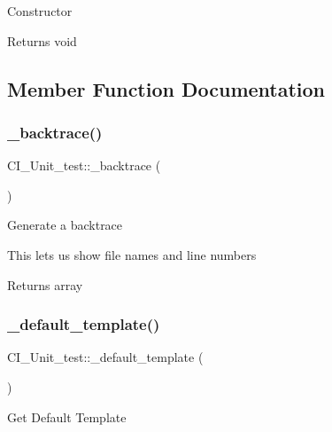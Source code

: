 Constructor

\begin{DoxyReturn}{Returns}
void 
\end{DoxyReturn}


\subsection{Member Function Documentation}
\mbox{\label{class_c_i___unit__test_aac2171b9c9a8e3365412af12f62d7cf8}} 
\subsubsection{\texorpdfstring{\+\_\+backtrace()}{\_backtrace()}}
{\footnotesize\ttfamily C\+I\+\_\+\+Unit\+\_\+test\+::\+\_\+backtrace (\begin{DoxyParamCaption}{ }\end{DoxyParamCaption})\hspace{0.3cm}{\ttfamily [protected]}}

Generate a backtrace

This lets us show file names and line numbers

\begin{DoxyReturn}{Returns}
array 
\end{DoxyReturn}
\mbox{\label{class_c_i___unit__test_a84be884853f375c13c8b2a17a5b649bd}} 
\subsubsection{\texorpdfstring{\+\_\+default\+\_\+template()}{\_default\_template()}}
{\footnotesize\ttfamily C\+I\+\_\+\+Unit\+\_\+test\+::\+\_\+default\+\_\+template (\begin{DoxyParamCaption}{ }\end{DoxyParamCaption})\hspace{0.3cm}{\ttfamily [protected]}}

Get Default Template

